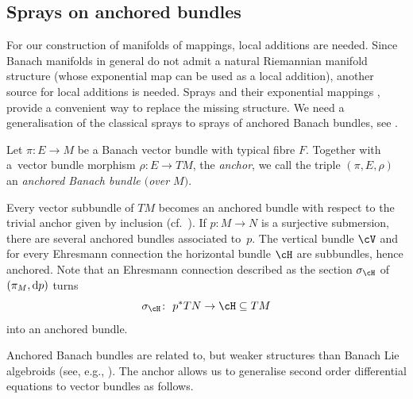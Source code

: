 \subsection{Sprays on anchored bundles}
For our construction of manifolds of mappings, local additions are needed. Since Banach manifolds in general do not admit a natural Riemannian manifold structure (whose exponential map can be used as a local addition), another source for local additions is needed. Sprays and their exponential mappings \cite{La01}, provide a convenient way to replace the missing structure. We need a generalisation of the classical sprays to sprays of anchored Banach bundles, see \cite{ana11,CaP12,CaMaS20}.

\begin{Definition}
Let $\pi \colon E \rightarrow M$ be a Banach vector bundle with typical fibre $F$. Together with a~vector bundle morphism $\rho \colon E \rightarrow TM$, the \emph{anchor}, we call the triple $(\pi,E,\rho)$ an \emph{anchored Banach bundle $($over $M)$}.
\end{Definition}

\begin{Example}\label{ex:subbun_anchor}
Every vector subbundle of $TM$ becomes an anchored bundle with respect to the trivial anchor given by inclusion (cf.\ \cite[Example~3.2]{CaP12}).
If $p\colon M \rightarrow N$ is a surjective submersion, there are several anchored bundles associated to~$p$. The vertical bundle $\cV$ and for every Ehresmann connection the horizontal bundle $\cH$ are subbundles, hence anchored. Note that an Ehresmann connection described as the section $\sigma_\cH$ of $(\pi_M,{\rm d}p)$ turns
\begin{displaymath}\sigma_{\cH} \colon\ p^\ast TN \rightarrow \cH \subseteq TM
\end{displaymath}
into an anchored bundle.
\end{Example}

Anchored Banach bundles are related to, but weaker structures than Banach Lie algebroids (see, e.g., \cite{AaGaS20, BaGaP19}). The anchor allows us to generalise second order differential equations to vector bundles as follows.

